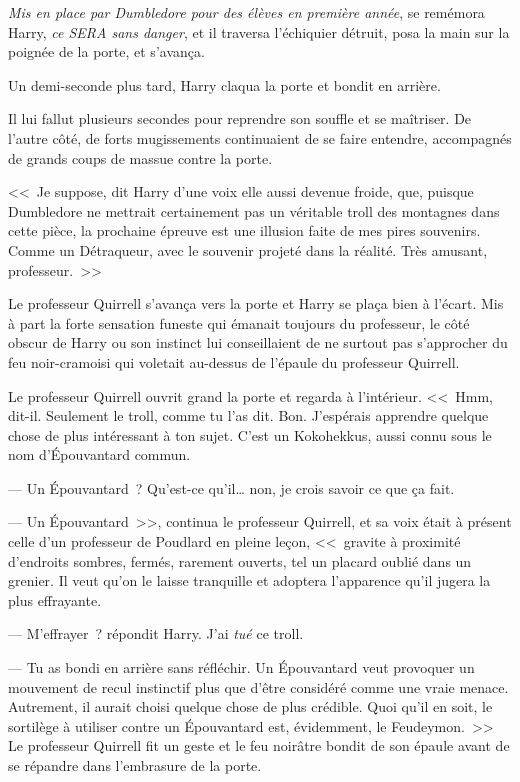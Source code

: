 \emph{Mis en place par Dumbledore pour des élèves en première année}, se remémora Harry, \emph{ce SERA sans danger}, et il traversa l'échiquier détruit, posa la main sur la poignée de la porte, et s'avança.

\later

Un demi-seconde plus tard, Harry claqua la porte et bondit en arrière.

Il lui fallut plusieurs secondes pour reprendre son souffle et se maîtriser. De l'autre côté, de forts mugissements continuaient de se faire entendre, accompagnés de grands coups de massue contre la porte.

<<~Je suppose, dit Harry d'une voix elle aussi devenue froide, que, puisque Dumbledore ne mettrait certainement pas un véritable troll des montagnes dans cette pièce, la prochaine épreuve est une illusion faite de mes pires souvenirs. Comme un Détraqueur, avec le souvenir projeté dans la réalité. Très amusant, professeur.~>>

Le professeur Quirrell s'avança vers la porte et Harry se plaça bien à l'écart. Mis à part la forte sensation funeste qui émanait toujours du professeur, le côté obscur de Harry ou son instinct lui conseillaient de ne surtout pas s'approcher du feu noir-cramoisi qui voletait au-dessus de l'épaule du professeur Quirrell.

Le professeur Quirrell ouvrit grand la porte et regarda à l'intérieur. <<~Hmm, dit-il. Seulement le troll, comme tu l'as dit. Bon. J'espérais apprendre quelque chose de plus intéressant à ton sujet. C'est un Kokohekkus, aussi connu sous le nom d'Épouvantard commun.

--- Un Épouvantard~? Qu'est-ce qu'il… non, je crois savoir ce que ça fait.

--- Un Épouvantard~>>, continua le professeur Quirrell, et sa voix était à présent celle d'un professeur de Poudlard en pleine leçon, <<~gravite à proximité d'endroits sombres, fermés, rarement ouverts, tel un placard oublié dans un grenier. Il veut qu'on le laisse tranquille et adoptera l'apparence qu'il jugera la plus effrayante.

--- M'effrayer~? répondit Harry. J'ai \emph{tué} ce troll.

--- Tu as bondi en arrière sans réfléchir. Un Épouvantard veut provoquer un mouvement de recul instinctif plus que d'être considéré comme une vraie menace. Autrement, il aurait choisi quelque chose de plus crédible. Quoi qu'il en soit, le sortilège à utiliser contre un Épouvantard est, évidemment, le Feudeymon.~>> Le professeur Quirrell fit un geste et le feu noirâtre bondit de son épaule avant de se répandre dans l'embrasure de la porte.

